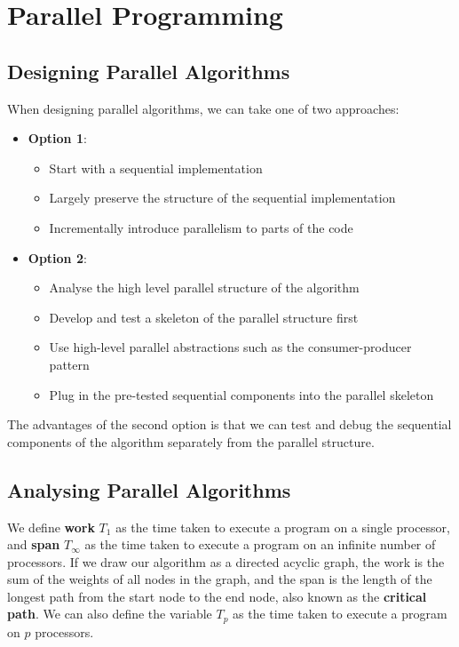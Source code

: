 \documentclass{article}
\begin{document}
\section{Parallel Programming}
\subsection{Designing Parallel Algorithms}
When designing parallel algorithms, we can take one of two approaches:
\begin{itemize}
    \item \textbf{Option 1}:
          \begin{itemize}
              \item Start with a sequential implementation
              \item Largely preserve the structure of the sequential
                    implementation
              \item Incrementally introduce parallelism to parts of the
                    code
          \end{itemize}
    \item \textbf{Option 2}:
          \begin{itemize}
              \item Analyse the high level parallel structure of the
                    algorithm
              \item Develop and test a skeleton of the parallel
                    structure first
              \item Use high-level parallel abstractions such as the
                    consumer-producer pattern
              \item Plug in the pre-tested sequential components into
                    the parallel skeleton
          \end{itemize}
\end{itemize}
The advantages of the second option is that we can test and debug the
sequential components of the algorithm separately from the parallel
structure.
\subsection{Analysing Parallel Algorithms}
We define \textbf{work} \(T_1\) as the time taken to execute a program
on a single processor, and \textbf{span} \(T_\infty\) as the time taken
to execute a program on an infinite number of processors. If we draw
our algorithm as a directed acyclic graph, the work is the sum of the
weights of all nodes in the graph, and the span is the length of the
longest path from the start node to the end node, also known as the
\textbf{critical path}. We can also define the variable \(T_p\) as the
time taken to execute a program on \(p\) processors.
\end{document}
